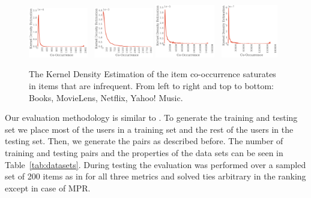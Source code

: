 \begin{figure}
\hfill
\includegraphics[width=0.23\textwidth]{kde_occurrencebooks.pdf}~%
\includegraphics[width=0.23\textwidth]{kde_occurrencemovielense.pdf}
\includegraphics[width=0.23\textwidth]{kde_occurrencenetflix.pdf}~%
\includegraphics[width=0.22\textwidth]{kde_occurrenceymusic.pdf}
\caption{The Kernel Density Estimation of the item co-occurrence saturates in items that are infrequent. From left to right and top to bottom: Books, MovieLens, Netflix, Yahoo! Music.}
\label{fig:kde_occurrence}
\end{figure}

Our evaluation methodology is similar to \cite{koenigstein2013towards}. To generate the training and testing set we place most of the users in a training set and the rest of the users in the testing set. Then, we generate the pairs as described before. The number of training and testing pairs and the properties of the data sets can be seen in Table~\ref{tab:datasets}.
During testing the evaluation was performed over a sampled set of 200 items as in \cite{koenigstein2013towards} for all three metrics and solved ties arbitrary in the ranking except 
in case of MPR. %

